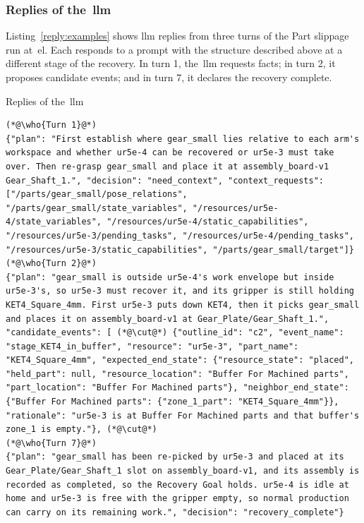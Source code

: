 \subsubsection{Replies of the~\texorpdfstring{\gls{llm}}{LLM}}\label{sec:replies}

Listing~\ref{reply:examples} shows \gls{llm} replies from three turns of the Part slippage run at~\gls{el}. Each
responds to a prompt with the structure described above at a different stage of the recovery.
In turn 1, the~\gls{llm} requests facts; in turn 2, it proposes candidate events; and in turn 7, it
declares the recovery complete.

\begin{recbox}{Replies of the~\gls{llm}}
\begin{lstlisting}
(*@\who{Turn 1}@*)
{"plan": "First establish where gear_small lies relative to each arm's workspace and whether ur5e-4 can be recovered or ur5e-3 must take over. Then re-grasp gear_small and place it at assembly_board-v1 Gear_Shaft_1.", "decision": "need_context", "context_requests": ["/parts/gear_small/pose_relations", "/parts/gear_small/state_variables", "/resources/ur5e-4/state_variables", "/resources/ur5e-4/static_capabilities", "/resources/ur5e-3/pending_tasks", "/resources/ur5e-4/pending_tasks", "/resources/ur5e-3/static_capabilities", "/parts/gear_small/target"]}
(*@\who{Turn 2}@*)
{"plan": "gear_small is outside ur5e-4's work envelope but inside ur5e-3's, so ur5e-3 must recover it, and its gripper is still holding KET4_Square_4mm. First ur5e-3 puts down KET4, then it picks gear_small and places it on assembly_board-v1 at Gear_Plate/Gear_Shaft_1.", "candidate_events": [ (*@\cut@*) {"outline_id": "c2", "event_name": "stage_KET4_in_buffer", "resource": "ur5e-3", "part_name": "KET4_Square_4mm", "expected_end_state": {"resource_state": "placed", "held_part": null, "resource_location": "Buffer For Machined parts", "part_location": "Buffer For Machined parts"}, "neighbor_end_state": {"Buffer For Machined parts": {"zone_1_part": "KET4_Square_4mm"}}, "rationale": "ur5e-3 is at Buffer For Machined parts and that buffer's zone_1 is empty."}, (*@\cut@*)
(*@\who{Turn 7}@*)
{"plan": "gear_small has been re-picked by ur5e-3 and placed at its Gear_Plate/Gear_Shaft_1 slot on assembly_board-v1, and its assembly is recorded as completed, so the Recovery Goal holds. ur5e-4 is idle at home and ur5e-3 is free with the gripper empty, so normal production can carry on its remaining work.", "decision": "recovery_complete"}
\end{lstlisting}
\end{recbox}
